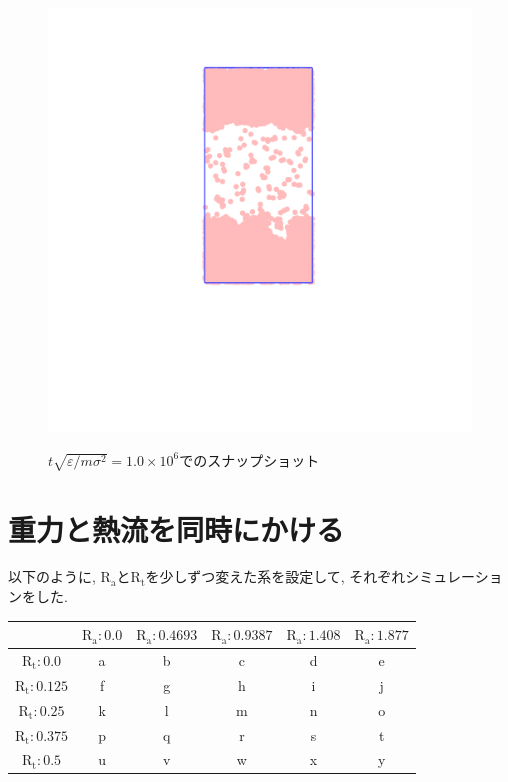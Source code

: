 \begin{figure}[H]
  \centering
  \href{https://youtu.be/CIEyUPvPY6A}{\includegraphics[scale=0.2]{image/2023-11-21T21:01:17.543_followup_chi1.265_Ay100_rho0.4_T0.43_dT0.04_Rd0.0_Rt0.5_Ra1.877538_g0.00019998593898298055_run1.0e8_output.png}}
  \caption{$t \sqrt{\varepsilon / m \sigma^2} = 1.0 \times 10^{6}$でのスナップショット}
  \label{}
\end{figure}

\section{重力と熱流を同時にかける}

以下のように, $\text{R}_\text{a}$と$\text{R}_\text{t}$を少しずつ変えた系を設定して, それぞれシミュレーションをした.

\vspace{1\baselineskip}

\begin{tabular}{|c|c|c|c|c|c|} \hline
        & $\text{R}_\text{a}:0.0$ & $\text{R}_\text{a}:0.4693$ & $\text{R}_\text{a}:0.9387$ & $\text{R}_\text{a}:1.408$ & $\text{R}_\text{a}:1.877$ \\ \hline
  $\text{R}_\text{t}:0.0$ & a      & b      & c      & d      & e     \\ \hline
  $\text{R}_\text{t}:0.125$ & f      & g      & h      & i      & j     \\ \hline
  $\text{R}_\text{t}:0.25$ & k      & l      & m      & n      & o     \\ \hline
  $\text{R}_\text{t}:0.375$ & p      & q      & r      & s      & t     \\ \hline
  $\text{R}_\text{t}:0.5$ & u      & v      & w      & x      & y     \\ \hline
\end{tabular}

